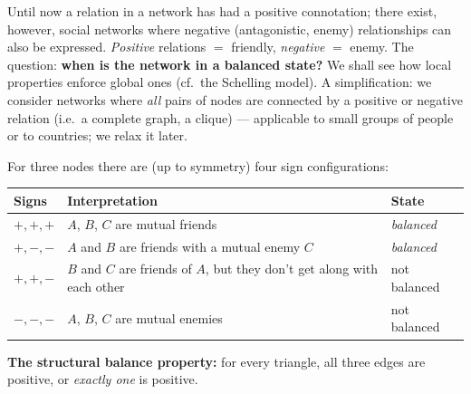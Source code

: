 \documentclass[11pt,a4paper]{article}
\theoremstyle{definition}
\begin{document}
Until now a relation in a network has had a positive connotation; there exist, however, social
networks where negative (antagonistic, enemy) relationships can also be expressed. \emph{Positive}
relations $=$ friendly, \emph{negative} $=$ enemy. The question: \textbf{when is the network in a
balanced state?} We shall see how local properties enforce global ones (cf.\ the Schelling model). A
simplification: we consider networks where \emph{all} pairs of nodes are connected by a positive or
negative relation (i.e.\ a complete graph, a clique) --- applicable to small groups of people or to
countries; we relax it later.

\begin{defbox}
For three nodes there are (up to symmetry) four sign configurations:
\begin{center}
\small
\begin{tabular}{@{}p{3.0cm}p{9.5cm}p{2.4cm}@{}}
\toprule
\textbf{Signs} & \textbf{Interpretation} & \textbf{State} \\
\midrule
$+,+,+$ & $A$, $B$, $C$ are mutual friends & \emph{balanced} \\
$+,-,-$ & $A$ and $B$ are friends with a mutual enemy $C$ & \emph{balanced} \\
$+,+,-$ & $B$ and $C$ are friends of $A$, but they don't get along with each other & not balanced \\
$-,-,-$ & $A$, $B$, $C$ are mutual enemies & not balanced \\
\bottomrule
\end{tabular}
\end{center}
\textbf{The structural balance property:} for every triangle, all three edges are positive, or
\emph{exactly one} is positive.
\end{defbox}
\end{document}
